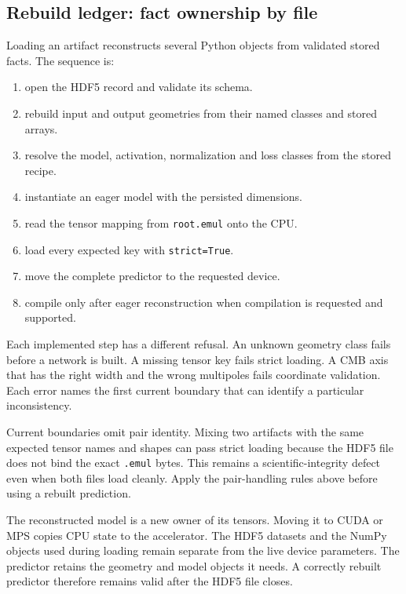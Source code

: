 \documentclass[10pt,aps,prd,twocolumn,nofootinbib]{revtex4-2}
\newcommand{\code}[1]{\texttt{#1}}
\begin{document}
\subsection{Rebuild ledger: fact ownership by file}

Loading an artifact reconstructs several Python objects from validated stored
facts.  The sequence is:
\begin{enumerate}
  \item open the HDF5 record and validate its schema.
  \item rebuild input and output geometries from their named classes and
        stored arrays.
  \item resolve the model, activation, normalization and loss classes from
        the stored recipe.
  \item instantiate an eager model with the persisted dimensions.
  \item read the tensor mapping from \code{root.emul} onto the CPU.
  \item load every expected key with \code{strict=True}.
  \item move the complete predictor to the requested device.
  \item compile only after eager reconstruction when compilation is requested
        and supported.
\end{enumerate}

Each implemented step has a different refusal.  An unknown geometry class
fails before a network is built.  A missing tensor key fails strict loading.
A CMB axis that has the right width and the wrong multipoles fails coordinate
validation.  Each error names the first current boundary that can identify a
particular inconsistency.

Current boundaries omit pair identity.  Mixing two artifacts with the same
expected tensor names and shapes can pass strict loading because the HDF5 file
does not bind the exact \code{.emul} bytes.  This remains a scientific-integrity
defect even when both files load cleanly.  Apply the pair-handling rules above
before using a rebuilt prediction.

The reconstructed model is a new owner of its tensors.  Moving it to CUDA or
MPS copies CPU state to the accelerator.  The HDF5 datasets and the NumPy
objects used during loading remain separate from the live device parameters.
The predictor retains the geometry and model objects it needs.  A correctly
rebuilt predictor therefore remains valid after the HDF5 file closes.
\end{document}
